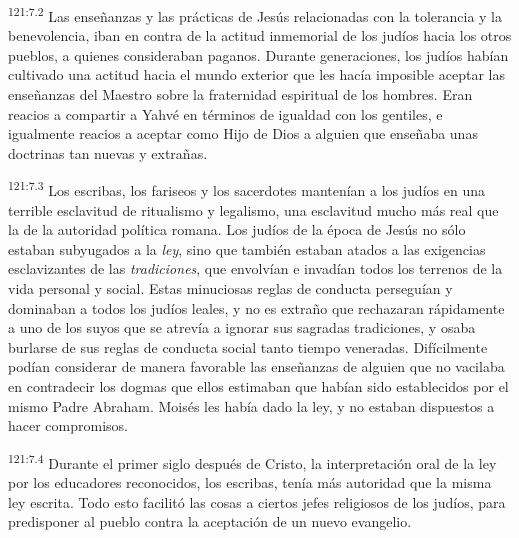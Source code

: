 \par
\textsuperscript{121:7.2} Las enseñanzas y las prácticas de Jesús relacionadas con la tolerancia y la benevolencia, iban en contra de la actitud inmemorial de los judíos hacia los otros pueblos, a quienes consideraban paganos. Durante generaciones, los judíos habían cultivado una actitud hacia el mundo exterior que les hacía imposible aceptar las enseñanzas del Maestro sobre la fraternidad espiritual de los hombres. Eran reacios a compartir a Yahvé en términos de igualdad con los gentiles, e igualmente reacios a aceptar como Hijo de Dios a alguien que enseñaba unas doctrinas tan nuevas y extrañas.

\par
\textsuperscript{121:7.3} Los escribas, los fariseos y los sacerdotes mantenían a los judíos en una terrible esclavitud de ritualismo y legalismo, una esclavitud mucho más real que la de la autoridad política romana. Los judíos de la época de Jesús no sólo estaban subyugados a la \textit{ley}, sino que también estaban atados a las exigencias esclavizantes de las \textit{tradiciones}, que envolvían e invadían todos los terrenos de la vida personal y social. Estas minuciosas reglas de conducta perseguían y dominaban a todos los judíos leales, y no es extraño que rechazaran rápidamente a uno de los suyos que se atrevía a ignorar sus sagradas tradiciones, y osaba burlarse de sus reglas de conducta social tanto tiempo veneradas. Difícilmente podían considerar de manera favorable las enseñanzas de alguien que no vacilaba en contradecir los dogmas que ellos estimaban que habían sido establecidos por el mismo Padre Abraham. Moisés les había dado la ley, y no estaban dispuestos a hacer compromisos.

\par
\textsuperscript{121:7.4} Durante el primer siglo después de Cristo, la interpretación oral de la ley por los educadores reconocidos, los escribas, tenía más autoridad que la misma ley escrita. Todo esto facilitó las cosas a ciertos jefes religiosos de los judíos, para predisponer al pueblo contra la aceptación de un nuevo evangelio.


